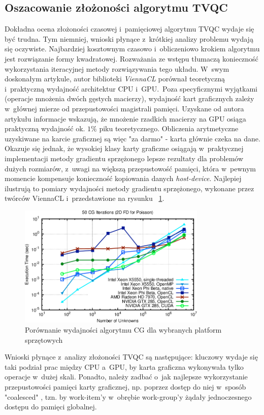 \subsection{Oszacowanie złożoności algorytmu TVQC}
Dokładna ocena złożoności czasowej i~pamięciowej algorytmu TVQC wydaje się być trudna. Tym niemniej, wnioski płynące z~krótkiej analizy problemu wydają się oczywiste. Najbardziej kosztownym czasowo i~obliczeniowo krokiem algorytmu jest rozwiązanie formy kwadratowej. Rozważania ze wstępu tłumaczą konieczność wykorzystania iteracyjnej metody rozwiązywania tego układu. W~swym doskonałym artykule, autor biblioteki \textit{ViennaCL} porównał teoretyczną i~praktyczną wydajność architektur CPU i~GPU.~Poza specyficznymi wyjątkami (operacje mnożenia dwóch gęstych macierzy), wydajność kart graficznych zależy w~głównej mierze od przepustowości magistrali pamięci. Uzyskane od autora artykułu informacje wskazują, że mnożenie rzadkich macierzy na GPU osiąga praktyczną wydajność ok. $1\%$ piku teoretycznego. Obliczenia arytmetyczne uzyskiwane na karcie graficznej są więc "za darmo" - karta głównie czeka na dane. Okazuje się jednak, że wysokiej klasy karty graficzne osiągają w~praktycznej implementacji metody gradientu sprzężonego lepsze rezultaty dla problemów dużych rozmiarów, z~uwagi na większą przepustowość pamięci, która w~pewnym momencie kompensuje konieczność kopiowania danych \textit{host-device}. Najlepiej ilustrują to pomiary wydajności metody gradientu sprzężonego, wykonane przez twórców ViennaCL i~przedstawione na rysunku ~\ref{fig:CGPerformance}.
\begin{figure}[H]
\centering
	\includegraphics[width=0.8\textwidth]{rysunki/cg-timings.png}
\caption{Porównanie wydajności algorytmu CG dla wybranych platform sprzętowych \cite{ViennaCL}}
\label{fig:CGPerformance}
\end{figure}

Wnioski płynące z~analizy złożoności TVQC są następujące: kluczowy wydaje się taki podział prac między CPU a~GPU, by karta graficzna wykonywała tylko operacje w~dużej skali. Ponadto, należy zadbać o~jak najlepsze wykorzystanie przepustowości pamięci karty graficznej, np. poprzez dostęp do niej w~sposób "coalesced" \cite{CoalescedIntro}, tzn. by work-item'y w~obrębie work-group'y żądały jednoczesnego dostępu do pamięci globalnej.